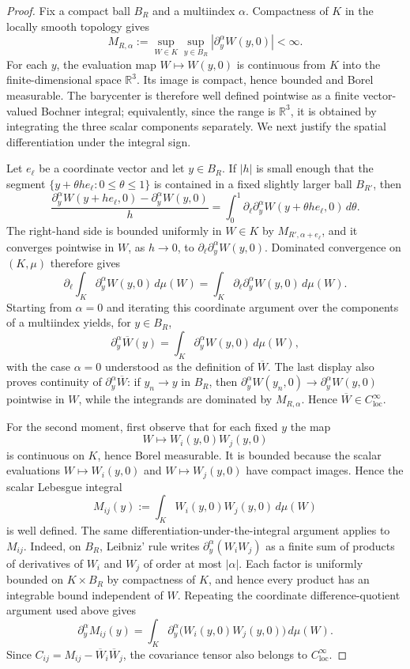 \documentclass[11pt]{amsart}
\theoremstyle{plain}
\theoremstyle{definition}
\theoremstyle{remark}
\numberwithin{equation}{section}
\begin{document}
\begin{proof}
Fix a compact ball \(B_R\) and a multiindex \(\alpha\).  Compactness of \(K\)
in the locally smooth topology gives
\[
   M_{R,\alpha}
   :=
   \sup_{W\in K}\sup_{y\in B_R}
   |\partial_y^\alpha W(y,0)|
   <\infty .
\]
For each \(y\), the evaluation map \(W\mapsto W(y,0)\) is continuous from
\(K\) into the finite-dimensional space \(\mathbb R^3\).  Its image is compact,
hence bounded and Borel measurable.  The barycenter is therefore well defined
pointwise as a finite vector-valued Bochner integral; equivalently, since the
range is \(\mathbb R^3\), it is obtained by integrating the three scalar
components separately.  We next justify the spatial differentiation under the
integral sign.

Let \(e_\ell\) be a coordinate vector and let \(y\in B_R\).  If
\(|h|\) is small enough that the segment
\(\{y+\theta h e_\ell:0\le\theta\le1\}\) is contained in a fixed slightly
larger ball \(B_{R'}\), then
\[
   \frac{\partial_y^\alpha W(y+he_\ell,0)-\partial_y^\alpha W(y,0)}{h}
   =
   \int_0^1
   \partial_\ell\partial_y^\alpha W(y+\theta h e_\ell,0)\,d\theta .
\]
The right-hand side is bounded uniformly in \(W\in K\) by
\(M_{R',\alpha+e_\ell}\), and it converges pointwise in \(W\), as \(h\to0\),
to \(\partial_\ell\partial_y^\alpha W(y,0)\).  Dominated convergence on
\((K,\mu)\) therefore gives
\[
   \partial_\ell
   \int_K \partial_y^\alpha W(y,0)\,d\mu(W)
   =
   \int_K\partial_\ell\partial_y^\alpha W(y,0)\,d\mu(W).
\]
Starting from \(\alpha=0\) and iterating this coordinate argument over the
components of a multiindex yields, for \(y\in B_R\),
\[
   \partial_y^\alpha\overline W(y)
   =
   \int_K\partial_y^\alpha W(y,0)\,d\mu(W),
\]
with the case \(\alpha=0\) understood as the definition of
\(\overline W\).  The last display also proves continuity of
\(\partial_y^\alpha\overline W\): if \(y_n\to y\) in \(B_R\), then
\(\partial_y^\alpha W(y_n,0)\to\partial_y^\alpha W(y,0)\) pointwise in
\(W\), while the integrands are dominated by \(M_{R,\alpha}\).  Hence
\(\overline W\in C^\infty_{\mathrm{loc}}\).

For the second moment, first observe that for each fixed \(y\) the map
\[
   W\mapsto W_i(y,0)W_j(y,0)
\]
is continuous on \(K\), hence Borel measurable.  It is bounded because the
scalar evaluations \(W\mapsto W_i(y,0)\) and \(W\mapsto W_j(y,0)\) have compact
images.  Hence the scalar Lebesgue integral
\[
   M_{ij}(y):=\int_K W_i(y,0)W_j(y,0)\,d\mu(W)
\]
is well defined.  The same
differentiation-under-the-integral argument applies to \(M_{ij}\).  Indeed,
on \(B_R\), Leibniz' rule writes \(\partial_y^\alpha(W_iW_j)\) as a finite sum
of products of derivatives of \(W_i\) and \(W_j\) of order at most
\(|\alpha|\).  Each factor is uniformly bounded on \(K\times B_R\) by
compactness of \(K\), and hence every product has an integrable bound
independent of \(W\).  Repeating the coordinate difference-quotient argument
used above gives
\[
   \partial_y^\alpha M_{ij}(y)
   =
   \int_K\partial_y^\alpha\bigl(W_i(y,0)W_j(y,0)\bigr)\,d\mu(W).
\]
Since \(C_{ij}=M_{ij}-\overline W_i\overline W_j\), the covariance tensor also
belongs to \(C^\infty_{\mathrm{loc}}\).


\end{proof}
\end{document}
